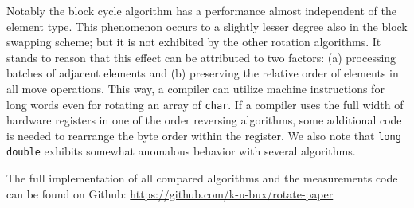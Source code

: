   Notably the block cycle
  algorithm has a performance almost independent of the element type.
  This phenomenon occurs to a slightly lesser degree also in the
  block swapping scheme; but it is not exhibited by the other rotation
  algorithms. It stands to reason that this effect can be attributed to
  two factors: (a) processing batches of adjacent elements and (b)
  preserving the relative order of elements in all move operations. This
  way, a compiler can utilize machine instructions for long words even
  for rotating an array of \verb+char+. If a compiler uses the full
  width of hardware registers in one of the order reversing algorithms,
  some additional code is needed to rearrange the byte order within the
  register.  We also note that \verb+long double+ exhibits somewhat
  anomalous behavior with several algorithms.

  The full implementation of all compared algorithms and the measurements
  code can be found on Github: \url{https://github.com/k-u-bux/rotate-paper}
  

